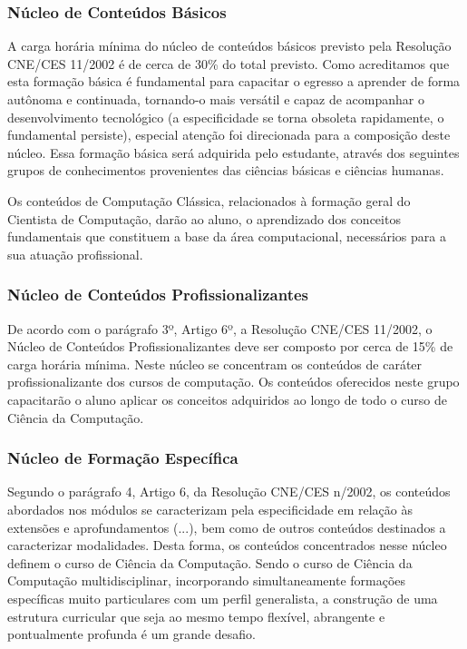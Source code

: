 \subsubsection{Núcleo de Conteúdos Básicos}
A carga horária mínima do núcleo de conteúdos básicos previsto pela Resolução CNE/CES 11/2002 é de cerca de 30\% do total previsto. Como acreditamos que esta formação básica é fundamental para capacitar o egresso a aprender de forma autônoma e continuada, tornando-o mais versátil e capaz de acompanhar o desenvolvimento tecnológico (a especificidade se torna obsoleta rapidamente, o fundamental persiste), especial atenção foi direcionada para a composição deste núcleo. Essa formação básica será adquirida pelo estudante, através dos seguintes grupos de conhecimentos provenientes das ciências básicas e ciências humanas.

Os conteúdos de Computação Clássica, relacionados à formação geral do Cientista de Computação, darão ao aluno, o aprendizado dos conceitos fundamentais que constituem a base da área computacional, necessários para a sua atuação profissional. 

\subsubsection{Núcleo de Conteúdos Profissionalizantes}

De acordo com o parágrafo 3º, Artigo 6º, a Resolução CNE/CES 11/2002, o Núcleo de Conteúdos Profissionalizantes deve ser composto por cerca de 15\% de carga horária mínima. Neste núcleo se concentram os conteúdos de caráter profissionalizante dos cursos de computação. Os conteúdos oferecidos neste grupo capacitarão o aluno aplicar os conceitos adquiridos ao longo de todo o curso de Ciência da Computação. 

\subsubsection{Núcleo de Formação Específica}
Segundo o parágrafo 4\textordmasculine, Artigo 6\textordmasculine, da Resolução CNE/CES n/2002, os conteúdos abordados nos módulos se caracterizam pela especificidade em relação às extensões e aprofundamentos (...), bem como de outros conteúdos destinados a caracterizar modalidades. Desta forma, os conteúdos concentrados nesse núcleo definem o curso de Ciência da Computação. Sendo o curso de Ciência da Computação multidisciplinar,	incorporando	simultaneamente	formações	específicas	muito particulares com um perfil generalista, a construção de uma estrutura curricular que seja ao mesmo tempo flexível, abrangente e pontualmente profunda é um grande desafio. 

